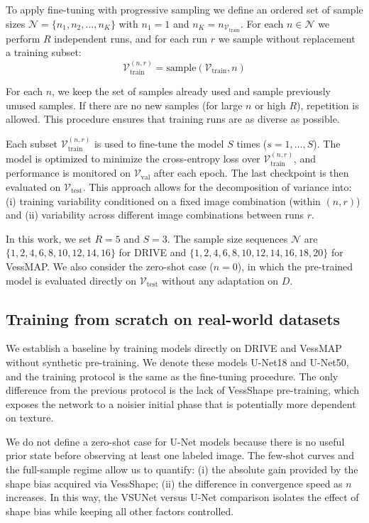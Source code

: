\documentclass[%
reprint,
nofootinbib,
 amsmath,amssymb,
aps,
superscriptaddress,
showkeys,
longbibliography
]{revtex4-1}
\begin{document}
To apply fine-tuning with progressive sampling we define an ordered set of sample sizes $\mathcal{N} = \{ n_1, n_2, \ldots, n_K \}$ with $n_1 = 1$ and $n_K = n_{\mathcal{V}_{\text{train}}}$. For each $n \in \mathcal{N}$ we perform $R$ independent runs, and for each run $r$ we sample without replacement a training subset:
\[
\mathcal{V}^{(n,r)}_{\text{train}} = \text{sample}(\mathcal{V}_{\text{train}}, n)
\]

For each $n$, we keep the set of samples already used and sample previously unused samples. If there are no new samples (for large $n$ or high $R$), repetition is allowed. This procedure ensures that training runs are as diverse as possible.

Each subset $\mathcal{V}^{(n,r)}_{\text{train}}$ is used to fine-tune the model $S$ times ($s=1,\ldots,S$). The model is optimized to minimize the cross-entropy loss over $\mathcal{V}^{(n,r)}_{\text{train}}$, and performance is monitored on $\mathcal{V}_{\text{val}}$ after each epoch. The last checkpoint is then evaluated on $\mathcal{V}_{\text{test}}$. This approach allows for the decomposition of variance into: (i) training variability conditioned on a fixed image combination (within $(n,r)$) and (ii) variability across different image combinations between runs $r$.

In this work, we set $R=5$ and $S=3$. The sample size sequences $\mathcal{N}$ are $\{1,2,4,6,8,10, 12, 14, 16\}$ for DRIVE and $\{1,2,4,6,8,10, 12, 14, 16,18,20\}$ for VessMAP. We also consider the zero-shot case ($n=0$), in which the pre-trained model is evaluated directly on $\mathcal{V}_{\text{test}}$ without any adaptation on $D$. 


\subsection{Training from scratch on real-world datasets}

We establish a baseline by training models directly on DRIVE and VessMAP without synthetic pre-training. We denote these models U-Net18 and U-Net50, and the training protocol is the same as the fine-tuning procedure. The only difference from the previous protocol is the lack of VessShape pre-training, which exposes the network to a noisier initial phase that is potentially more dependent on texture.

We do not define a zero-shot case for U-Net models because there is no useful prior state before observing at least one labeled image. The few-shot curves and the full-sample regime allow us to quantify: (i) the absolute gain provided by the shape bias acquired via VessShape; (ii) the difference in convergence speed as $n$ increases. In this way, the VSUNet versus U-Net comparison isolates the effect of shape bias while keeping all other factors controlled.
\end{document}
